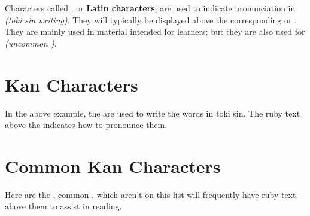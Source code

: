 \documentclass[twoside, 12pt]{ctexart}
\begin{document}
{{{Characters called
\textbf{}, or \textbf{Latin characters},
are used to indicate pronunciation in  {\textit{(toki sin writing)}}.
They will typically be displayed above the corresponding 
 or .
They are mainly used in material intended for learners;
but they are also used for  {\textit{(uncommon )}}.

\newpage
\section[画漢 – Sitelen Kan]{
  \Huge\englishundertokisin
    {}
    {\small\normalfont{}Kan Characters}
}

{
\begin{exe}
\end{exe}
}

In the above example, the  are used to write the words in toki sin.
The ruby text above the  indicates how to pronounce them.

\newpage
\section[画多 – Common Characters]{
  \Huge\englishundertokisin
    {}
    {\small\normalfont{}Common Kan Characters}
}

Here are the ,
common .
 which aren't on this list will frequently have ruby text above them to assist in reading.\\

{
\Huge
{}






}

}}}
\end{document}
